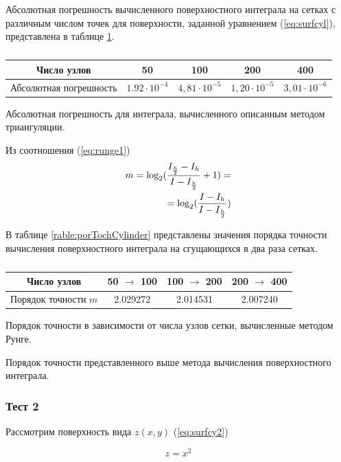 \documentclass{article}
\begin{document}
Абсолютная погрешность вычисленного поверхностного интеграла на сетках с различным числом точек для поверхности, заданной уравнением (\ref{eq:surfcyl}), представлена в таблице \ref{table:abspogcylinder}.

\begin{table}[ht]
\centering
\begin{tabular}{|c|c|c|c|c|}
\hline
 Число узлов			& 50					& 100					& 200					& 400		\\ 
\hline
 Абсолютная погрешность & $1.92 \cdot 10^{-4}$	& $4,81 \cdot 10^{-5}$	& $1,20 \cdot 10^{-5}$	& $3,01 \cdot 10^{-6}$	\\  
\hline
\end{tabular}
\caption{\label{table:abspogcylinder}}
Абсолютная погрешность для интеграла, вычисленного описанным методом триангуляции.
\end{table}

Из соотношения (\ref{eq:runge1})
\begin{align}\label{eq:runge2}
m = \log_2(\frac{I_{\frac{h}{2}}-I_{h}}{I-I_{\frac{h}{2}}}+1) = \notag \\ 
= \log_2(\frac{I-I_{h}}{I-I_{\frac{h}{2}}})
\end{align}

В таблице \ref{rable:porTochCylinder} представлены значения порядка точности вычисления поверхностного интеграла на сгущающихся в два раза сетках.

\begin{table}[ht]
\centering
\begin{tabular}{|c|c|c|c|}
\hline
 Число узлов		& 50 $\rightarrow$ 100	& 100 $\rightarrow$ 200	& 200 $\rightarrow$ 400	\\ 
\hline
 Порядок точности $m$	& 2.029272	& 2.014531	& 2.007240	\\  
\hline
\end{tabular}
\caption{\label{table:porTochCylinder}}
Порядок точности в зависимости от числа узлов сетки, вычисленные методом Рунге.
\end{table}

Порядок точности представленного выше метода вычисления поверхностного интеграла.

\subsubsection*{Тест 2}

Рассмотрим поверхность вида $z(x,y)$ (\ref{eq:surfcy2})

\begin{equation}\label{eq:surfcy2}
z = x^2
\end{equation}
\end{document}
